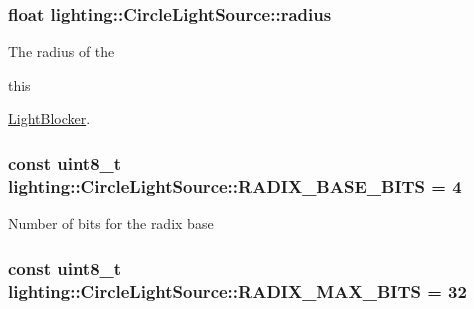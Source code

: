 \subsubsection[{\texorpdfstring{radius}{radius}}]{\setlength{\rightskip}{0pt plus 5cm}float lighting\+::\+Circle\+Light\+Source\+::radius\hspace{0.3cm}{\ttfamily [protected]}}\hypertarget{classlighting_1_1CircleLightSource_a4da9b32f524563c2faeba5ea81dfe6fb}{}\label{classlighting_1_1CircleLightSource_a4da9b32f524563c2faeba5ea81dfe6fb}


The radius of the 
\begin{DoxyCode}
\textcolor{keyword}{this}
\end{DoxyCode}
 \hyperlink{classlighting_1_1LightBlocker}{Light\+Blocker}. 

\subsubsection[{\texorpdfstring{R\+A\+D\+I\+X\+\_\+\+B\+A\+S\+E\+\_\+\+B\+I\+TS}{RADIX_BASE_BITS}}]{\setlength{\rightskip}{0pt plus 5cm}const uint8\+\_\+t lighting\+::\+Circle\+Light\+Source\+::\+R\+A\+D\+I\+X\+\_\+\+B\+A\+S\+E\+\_\+\+B\+I\+TS = 4\hspace{0.3cm}{\ttfamily [static]}}\hypertarget{classlighting_1_1CircleLightSource_a94be83c3a3e575b5670ec6c6abe8a6e7}{}\label{classlighting_1_1CircleLightSource_a94be83c3a3e575b5670ec6c6abe8a6e7}


Number of bits for the radix base 

\subsubsection[{\texorpdfstring{R\+A\+D\+I\+X\+\_\+\+M\+A\+X\+\_\+\+B\+I\+TS}{RADIX_MAX_BITS}}]{\setlength{\rightskip}{0pt plus 5cm}const uint8\+\_\+t lighting\+::\+Circle\+Light\+Source\+::\+R\+A\+D\+I\+X\+\_\+\+M\+A\+X\+\_\+\+B\+I\+TS = 32\hspace{0.3cm}{\ttfamily [static]}}\hypertarget{classlighting_1_1CircleLightSource_a9a4d058eac85eeb8c542abd69069e4b2}{}\label{classlighting_1_1CircleLightSource_a9a4d058eac85eeb8c542abd69069e4b2}


